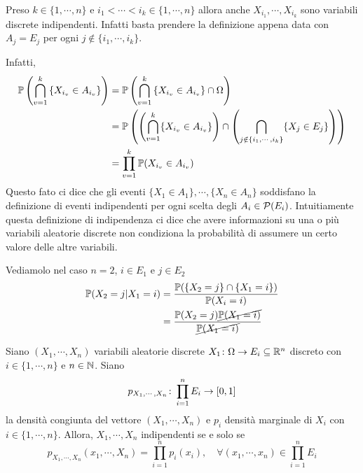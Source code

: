 \documentclass[a4paper]{article}
\begin{document}
Preso \(k \in \{1, \cdots, n\}\) e \(i_1 < \cdots < i_k \in \{1, \cdots, n\}\)
allora anche \(X_{i_1}, \cdots, X_{i_k}\) sono variabili discrete indipendenti.
Infatti basta prendere la definizione appena data con \(A_j = E_j\)
per ogni \(j \notin \{i_1, \cdots, i_k\}\).

Infatti,
\begin{align*}
    \mathbb P\left(
        \bigcap_{v = 1}^k \left\{X_{i_v} \in A_{i_v}\right\}
    \right)
    &= \mathbb P \left(
        \bigcap_{v = 1}^k \left\{X_{i_v} \in A_{i_v}\right\} \cap \Omega
    \right) \\
    &= \mathbb P \left(
        \left(
            \bigcap_{v=1}^k \{X_{i_v} \in A_{i_v}\}
        \right)
        \cap
        \left(
            \bigcap_{j \notin \{i_1, \cdots, i_k\}} \{X_j \in E_j\}
        \right)
    \right) \\
    &= \prod_{v=1}^k \mathbb P(X_{i_v} \in A_{i_v})
\end{align*}
Questo fato ci dice che gli eventi
\(\{X_1 \in A_1\}, \cdots, \{X_n \in A_n\}\)
soddisfano la definizione di eventi indipendenti per ogni scelta
degli \(A_i \in \mathcal P(E_i)\).
Intuitiamente questa definizione di indipendenza ci dice che
avere informazioni su una o più variabili aleatorie discrete non condiziona la probabilità
di assumere un certo valore delle altre variabili.

Vediamolo nel caso \(n=2\), \(i \in E_1\) e \(j \in E_2\)
\begin{align*}
    \mathbb P(X_2 = j | X_1 = i) &= \frac{
        \mathbb P(\{X_2 = j\} \cap \{X_1 = i\})
    }{
        \mathbb P(X_i = i)
    } \\
    &= \frac{
        \mathbb P(X_2 = j) \cancel{\mathbb P(X_1 = i)}
    }{
        \cancel{\mathbb P(X_1 = i)}
    }
\end{align*}

\begin{snippetproposition}{}
    Siano \((X_1, \cdots, X_n)\) variabili aleatorie discrete
    \(X_1 \colon \Omega \to E_i \subseteq \mathbb{R}^n\) discreto con
    \(i \in \{1, \cdots, n\}\) e \(n \in \mathbb{N}\).
    Siano \[
        p_{X_1, \cdots, X_n} \colon \prod_{i=1}^n E_i \to [0,1]
    \]
    la densità congiunta del vettore \((X_1, \cdots, X_n)\)
    e \(p_i\) densità marginale di \(X_i\) con \(i \in \{1, \cdots, n\}\).
    Allora, \(X_1, \cdots, X_n\) indipendenti se e solo se
    \[
        p_{X_1, \cdots, X_n}(x_1, \cdots, X_n)
        = \prod_{i=1}^n p_i(x_i), \quad \forall (x_1, \cdots, x_n) \in \prod_{i=1}^n E_i
    \]
\end{snippetproposition}
\end{document}
